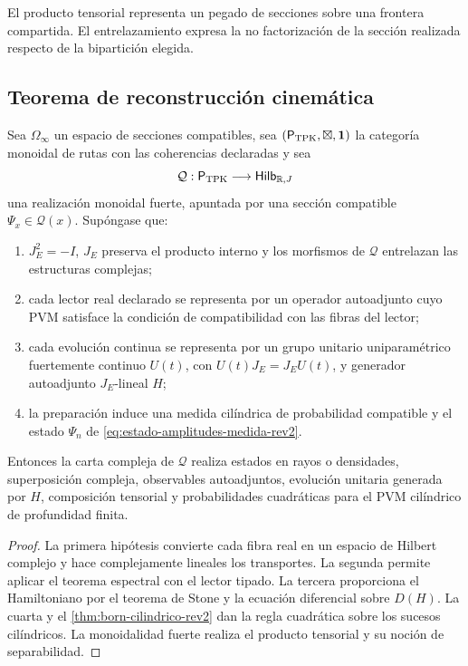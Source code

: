 \begin{principle}
El producto tensorial representa un pegado de secciones sobre una frontera
compartida. El entrelazamiento expresa la no factorización de la sección
realizada respecto de la bipartición elegida.
\end{principle}

\subsection{Teorema de reconstrucción cinemática}

\begin{theorem}
\label{thm:cinematica-cuantica-tpk-rev2}
Sea \(\Omega_\infty\) un espacio de secciones compatibles, sea
\((\mathsf P_{\rm TPK},\boxtimes,\mathbf 1)\) la categoría monoidal de rutas
con las coherencias declaradas y sea
\[
 \mathcal Q:\mathsf P_{\rm TPK}\longrightarrow
 \mathsf{Hilb}_{\mathbb R,J}
\]
una realización monoidal fuerte, apuntada por una sección compatible
\(\Psi_x\in\mathcal Q(x)\). Supóngase que:
\begin{enumerate}
 \item \(J_E^2=-I\), \(J_E\) preserva el producto interno y los morfismos de
 \(\mathcal Q\) entrelazan las estructuras complejas;
 \item cada lector real declarado se representa por un operador autoadjunto
 cuyo PVM satisface la condición de compatibilidad con las fibras del lector;
 \item cada evolución continua se representa por un grupo unitario
 uniparamétrico fuertemente continuo \(U(t)\), con
 \(U(t)J_E=J_EU(t)\), y generador autoadjunto \(J_E\)-lineal \(H\);
 \item la preparación induce una medida cilíndrica de probabilidad compatible
 y el estado \(\Psi_n\) de \eqref{eq:estado-amplitudes-medida-rev2}.
\end{enumerate}
Entonces la carta compleja de \(\mathcal Q\) realiza estados en rayos o
densidades, superposición compleja, observables autoadjuntos, evolución
unitaria generada por \(H\), composición tensorial y probabilidades
cuadráticas para el PVM cilíndrico de profundidad finita.
\end{theorem}

\begin{proof}
La primera hipótesis convierte cada fibra real en un espacio de Hilbert
complejo y hace complejamente lineales los transportes. La segunda permite
aplicar el teorema espectral con el lector tipado. La tercera proporciona el
Hamiltoniano por el teorema de Stone y la ecuación diferencial sobre
\(D(H)\). La cuarta y el \cref{thm:born-cilindrico-rev2} dan la regla
cuadrática sobre los sucesos cilíndricos. La monoidalidad fuerte realiza el
producto tensorial y su noción de separabilidad.
\end{proof}

